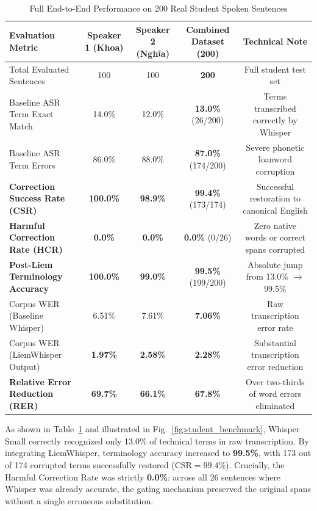 \documentclass[11pt,conference,onecolumn]{IEEEtran}
\begin{document}
\begin{table}[htbp]
\centering
\caption{Full End-to-End Performance on 200 Real Student Spoken Sentences}
\label{tab:200_results}
\begin{tabular}{@{}lcccc@{}}
\toprule
\textbf{Evaluation Metric} & \textbf{Speaker 1 (Khoa)} & \textbf{Speaker 2 (Nghĩa)} & \textbf{Combined Dataset (200)} & \textbf{Technical Note} \\
\midrule
Total Evaluated Sentences & 100 & 100 & \textbf{200} & Full student test set \\
Baseline ASR Term Exact Match & 14.0\% & 12.0\% & \textbf{13.0\%} (26/200) & Terms transcribed correctly by Whisper \\
Baseline ASR Term Errors & 86.0\% & 88.0\% & \textbf{87.0\%} (174/200) & Severe phonetic loanword corruption \\
\midrule
\textbf{Correction Success Rate (CSR)} & \textbf{100.0\%} & \textbf{98.9\%} & \textbf{99.4\%} (173/174) & Successful restoration to canonical English \\
\textbf{Harmful Correction Rate (HCR)} & \textbf{0.0\%} & \textbf{0.0\%} & \textbf{0.0\%} (0/26) & Zero native words or correct spans corrupted \\
\textbf{Post-Liem Terminology Accuracy} & \textbf{100.0\%} & \textbf{99.0\%} & \textbf{99.5\%} (199/200) & Absolute jump from 13.0\% $\to$ 99.5\% \\
\midrule
Corpus WER (Baseline Whisper) & 6.51\% & 7.61\% & \textbf{7.06\%} & Raw transcription error rate \\
Corpus WER (LiemWhisper Output) & \textbf{1.97\%} & \textbf{2.58\%} & \textbf{2.28\%} & Substantial transcription error reduction \\
\textbf{Relative Error Reduction (RER)} & \textbf{69.7\%} & \textbf{66.1\%} & \textbf{67.8\%} & Over two-thirds of word errors eliminated \\
\bottomrule
\end{tabular}
\end{table}

As shown in Table~\ref{tab:200_results} and illustrated in Fig.~\ref{fig:student_benchmark}, Whisper Small correctly recognized only 13.0\% of technical terms in raw transcription. By integrating LiemWhisper, terminology accuracy increased to \textbf{99.5\%}, with 173 out of 174 corrupted terms successfully restored ($\text{CSR} = 99.4\%$). Crucially, the Harmful Correction Rate was strictly \textbf{0.0\%}: across all 26 sentences where Whisper was already accurate, the gating mechanism preserved the original spans without a single erroneous substitution.
\end{document}
